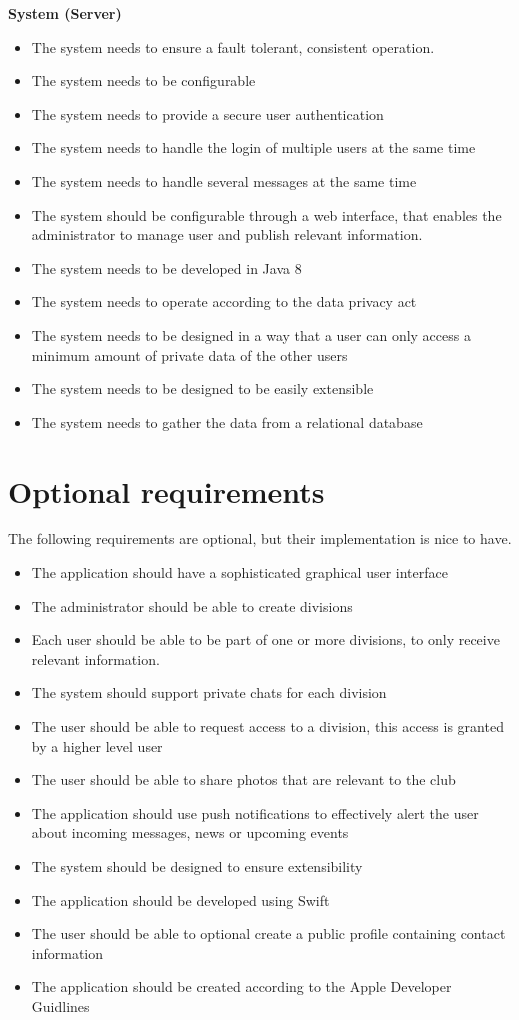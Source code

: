 \textbf{System (Server)}
\begin{itemize}
\item The system needs to ensure a fault tolerant, consistent operation.
\item The system needs to be configurable
\item The system needs to provide a secure user authentication
\item The system needs to handle the login of multiple users at the same time
\item The system needs to handle several messages at the same time
\item The system should be configurable through a web interface, that enables the administrator to manage user and publish relevant information.
\item The system needs to be developed in Java 8
\item The system needs to operate according to the data privacy act
\item The system needs to be designed in a way that a user can only access a minimum amount of private data of the other users
\item The system needs to be designed to be easily extensible
\item The system needs to gather the data from a relational database
\end{itemize}

\section{Optional requirements} %
The following requirements are optional, but their implementation is nice to have.
\begin{itemize}
\item The application should have a sophisticated graphical user interface
\item The administrator should be able to create divisions
\item Each user should be able to be part of one or more divisions, to only receive relevant information.
\item The system should support private chats for each division
\item The user should be able to request access to a division, this access is granted by a higher level user
\item The user should be able to share photos that are relevant to the club
\item The application should use push notifications to effectively alert the user about incoming messages, news or upcoming events
\item The system should be designed to ensure extensibility 
\item The application should be developed using Swift
\item The user should be able to optional create a public profile containing contact information
\item The application should be created according to the Apple Developer Guidlines
\end{itemize}

